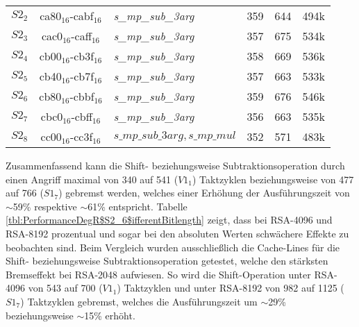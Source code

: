 \begin{table}[h]
\begin{tabular}{cclccc}
$S2_2$ & ca80$_{16}$-cabf$_{16}$  & \textit{s_mp_sub_3arg}             & 359   & 644         & 494k    \\
$S2_3$ & cac0$_{16}$-caff$_{16}$  & \textit{s_mp_sub_3arg}             & 357   & 675         & 534k    \\
$S2_4$ & cb00$_{16}$-cb3f$_{16}$  & \textit{s_mp_sub_3arg}            & 358   & 669         & 536k    \\
$S2_5$ & cb40$_{16}$-cb7f$_{16}$  & \textit{s_mp_sub_3arg}             & 357   & 663         & 533k    \\
$S2_6$ & cb80$_{16}$-cbbf$_{16}$  & \textit{s_mp_sub_3arg}             & 359   & 676         & 546k    \\
$S2_7$ & cbc0$_{16}$-cbff$_{16}$  & \textit{s_mp_sub_3arg}             & 356   & 663         & 535k    \\
$S2_8$ & cc00$_{16}$-cc3f$_{16}$  & $s\_mp\_sub\_3arg, s\_mp\_mul$ & 352   & 571         & 483k   
\end{tabular}
\end{table}


Zusammenfassend kann die Shift- beziehungsweise Subtraktionsoperation durch einen Angriff maximal von 340 auf 541 ($V1_1$) Taktzyklen beziehungsweise von 477 auf 766 ($S1_7$) gebremst werden, welches einer Erhöhung der Ausführungszeit von $\sim$59\% respektive $\sim$61\% entspricht.
Tabelle \ref{tbl:PerformanceDegR$S2_6$ifferentBitlength} zeigt, dass bei RSA-4096 und RSA-8192 prozentual und sogar bei den absoluten Werten schwächere Effekte zu beobachten sind.
Beim Vergleich wurden ausschließlich die Cache-Lines für die Shift- beziehungsweise Subtraktionsoperation getestet, welche den stärksten Bremseffekt bei RSA-2048 aufwiesen.
So wird die Shift-Operation unter RSA-4096 von 543 auf 700 ($V1_1$) Taktzyklen und unter RSA-8192 von 982 auf 1125 ($S1_7$) Taktzyklen gebremst, welches die Ausführungszeit um $\sim$29\% beziehungsweise $\sim$15\% erhöht.

